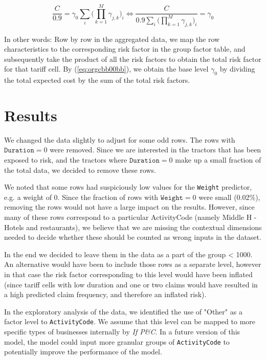 \documentclass[11pt]{article}
\begin{document}
\begin{enumerate}
\begin{equation}
\label{eq:orgcbb00bb}
\frac{C}{0.9} = \gamma_0 \sum_i \bigg ( \prod_{k = 1}^M \gamma_{j,k} \bigg)_i \iff \frac{C}{0.9 \sum_i \bigg ( \prod_{k = 1}^M \gamma_{j,k} \bigg)_i} = \gamma_0
\end{equation}

In other words: Row by row in the aggregated data, we map the row characteristics to the
corresponding risk factor  in the group factor table, and subsequently take the product of all 
the risk factors to obtain the total risk factor for that tariff cell. By (\ref{eq:orgcbb00bb}), we obtain the 
base level \(\gamma_0\) by dividing the total expected cost by the sum of the total risk factors.
\end{enumerate}

\section{Results}
\label{sec:orgac751e5}

We changed the data slightly to adjust for some odd rows. The rows with \(\texttt{Duration} = 0\) were removed. 
Since we are interested in the tractors that has been exposed to risk, and the tractors where 
\(\texttt{Duration} = 0\) make up a small fraction of the total data, we decided to remove these rows. 

We noted that some rows had suspiciously low values for the \texttt{Weight} predictor, e.g. a weight of 0. 
Since the fraction of rows with \(\texttt{Weight} = 0\) were small (0.02\%), removing the rows would not have
a large impact on the results. However, since many 
of these rows correspond to a particular ActivityCode (namely Middle H - Hotels and restaurants), 
we believe that we are missing the contextual dimensions needed to decide whether these should be counted 
as wrong inputs in the dataset. 

In the end we decided to leave them in the data as a part of the
group < 1000. An alternative would have been to include those rows as a separate level, however in that case the risk factor
corresponding to this level would have been inflated (since tariff cells with low duration and one or two
claims would have resulted in a high predicted claim frequency, and therefore an inflated risk).

In the exploratory analysis of the data, we identified the use of "Other" as a factor level to \texttt{ActivityCode}. 
We assume that this level can be mapped to more specific types of businesses internally by \emph{If P\&C}. In a future version
of this model, the model could input more granular groups of \texttt{ActivityCode} to potentially improve 
the performance of the model.
\end{document}
